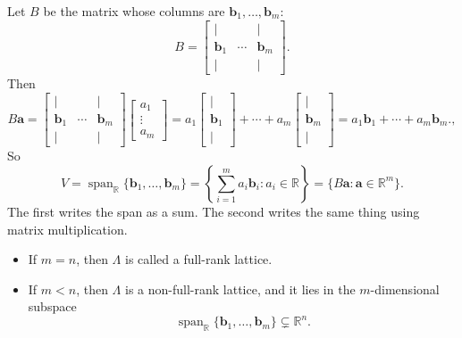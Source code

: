 \begin{remark}
Let \(B\) be the matrix whose columns are \(\mathbf b_1,\dots,\mathbf b_m\):
\[
B=
\begin{bmatrix}
	| & & |\\
	\mathbf b_1 & \cdots & \mathbf b_m\\
	| & & |
\end{bmatrix}.
\] Then
\[
B\mathbf a
=\begin{bmatrix}
	| & & |\\
	\mathbf b_1 & \cdots & \mathbf b_m\\
	| & & |
\end{bmatrix}\begin{bmatrix}
	a_1\\
	\vdots\\
	a_m
\end{bmatrix}=
a_1\begin{bmatrix}
	|\\  \mathbf b_1 \\|
\end{bmatrix}+
\cdots+
a_m\begin{bmatrix}
	|\\  \mathbf b_m \\|
\end{bmatrix}
=
a_1\mathbf b_1+\cdots+a_m\mathbf b_m.,
\]
So
\[
V=\operatorname{span}_{\mathbb R}\{\mathbf b_1,\dots,\mathbf b_m\}
=
\left\{\sum_{i=1}^m a_i\mathbf b_i:a_i\in\mathbb R\right\}
=
\{B\mathbf a:\mathbf a\in\mathbb R^m\}.
\]
The first writes the span as a sum.  
The second writes the same thing using matrix multiplication.
\end{remark}

\newpage
{}
\begin{remark}
\; \begin{itemize}
	\item If \(m=n\), then \(\Lambda\) is called a full-rank lattice.  
	\item If \(m<n\), then \(\Lambda\) is a non-full-rank lattice, and it lies in the
	\(m\)-dimensional subspace
	\[
	\operatorname{span}_{\mathbb R}\{\mathbf b_1,\dots,\mathbf b_m\}\subsetneq \mathbb R^n.
	\]
\end{itemize}
\end{remark}

